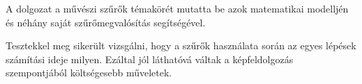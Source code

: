 

A dolgozat a művészi szűrők témakörét mutatta be azok matematikai modelljén és néhány saját szűrőmegvalósítás segítségével.

Tesztekkel meg sikerült vizsgálni, hogy a szűrők használata során az egyes lépések számítási ideje milyen. Ezáltal jól láthatóvá váltak a képfeldolgozás szempontjából költségesebb műveletek.




